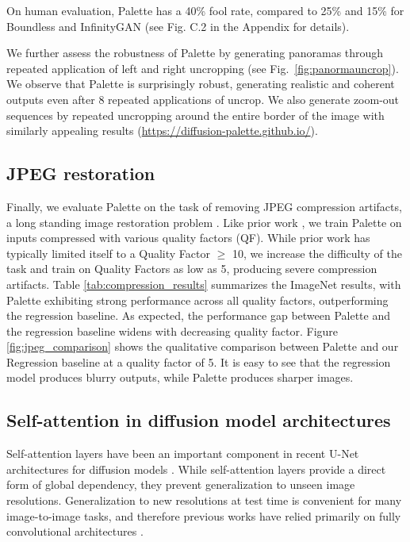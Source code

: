 On human evaluation, Palette has a 40\% fool rate, compared to 25\% and 15\% for Boundless and InfinityGAN (see Fig. C.2 in the Appendix for details).

We further assess the robustness of Palette by generating panoramas through repeated application of left and right uncropping (see Fig.\ \ref{fig:panormauncrop}).
We observe that Palette is surprisingly robust, generating realistic and coherent outputs even after 8 repeated applications of uncrop. We also generate zoom-out sequences by repeated uncropping around the entire border of the image with similarly appealing results (\url{https://diffusion-palette.github.io/}).

\subsection{JPEG restoration}

Finally, we evaluate Palette on the task of removing JPEG compression artifacts, a long standing image restoration problem \citep{dong2015compression, galteri2019deep, liu2018multi}. Like prior work \citep{ehrlich2020quantization, liu2018multi}, we train Palette on inputs compressed with various quality factors (QF). While prior work has typically limited itself to a Quality Factor $\geq$ 10, we increase the difficulty of the task and train on Quality Factors as low as 5, producing severe compression artifacts. Table \ref{tab:compression_results} summarizes the ImageNet results, with Palette exhibiting strong performance across all quality factors, outperforming the regression baseline. As expected, the performance gap between Palette and the  regression baseline widens with decreasing quality factor. Figure \ref{fig:jpeg_comparison} shows the qualitative comparison between Palette and our Regression baseline at a quality factor of 5. It is easy to see that the regression model produces blurry outputs, while Palette produces sharper images. 

\subsection{Self-attention in diffusion model architectures}

Self-attention layers \citep{vaswani-nips-2017} have been an important component in recent U-Net architectures for diffusion models \citep{ho2020denoising, dhariwal2021diffusion}. While self-attention layers provide a direct form of global dependency, they prevent generalization to unseen image resolutions. Generalization to new resolutions at test time is convenient for many image-to-image  tasks, and therefore previous works have  relied primarily on fully convolutional architectures \citep{yu2019free, galteri2019deep}.

